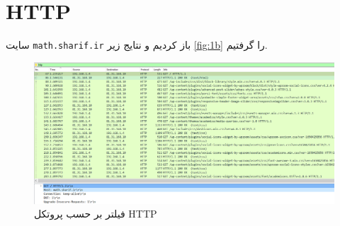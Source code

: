 \documentclass{perassignments}
\renewcommand{\maketitle}{\MakeMyLabTitle}
\begin{document}
	\maketitle
	\section{HTTP}
	سایت 
	\texttt{math.sharif.ir}
	باز کردیم و نتایج زیر 
	\ref{fig:1b}
	 را گرفتیم.
	\begin{figure}[H]
		\centering
		\includegraphics[width= 0.7\linewidth]{graphics/1a.png}
		\caption{فیلتر بر حسب پروتکل HTTP}
		\label{fig:1a}
	\end{figure}
\end{document}
